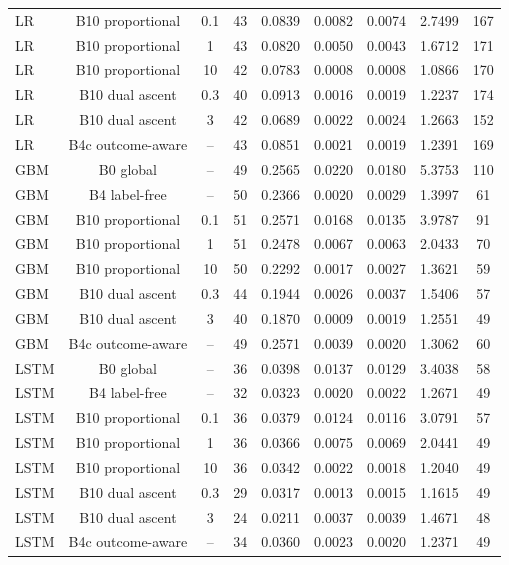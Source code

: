 \documentclass[10pt,onecolumn,letterpaper]{article}
\begin{document}
\begin{table}[!t]
{\begin{tabular}{lcccccccc}
LR & B10 proportional & 0.1 & 43 & 0.0839 & 0.0082 & 0.0074 & 2.7499 & 167 \\
LR & B10 proportional & 1 & 43 & 0.0820 & 0.0050 & 0.0043 & 1.6712 & 171 \\
LR & B10 proportional & 10 & 42 & 0.0783 & 0.0008 & 0.0008 & 1.0866 & 170 \\
LR & B10 dual ascent & 0.3 & 40 & 0.0913 & 0.0016 & 0.0019 & 1.2237 & 174 \\
LR & B10 dual ascent & 3 & 42 & 0.0689 & 0.0022 & 0.0024 & 1.2663 & 152 \\
LR & B4c outcome-aware & -- & 43 & 0.0851 & 0.0021 & 0.0019 & 1.2391 & 169 \\
GBM & B0 global & -- & 49 & 0.2565 & 0.0220 & 0.0180 & 5.3753 & 110 \\
GBM & B4 label-free & -- & 50 & 0.2366 & 0.0020 & 0.0029 & 1.3997 & 61 \\
GBM & B10 proportional & 0.1 & 51 & 0.2571 & 0.0168 & 0.0135 & 3.9787 & 91 \\
GBM & B10 proportional & 1 & 51 & 0.2478 & 0.0067 & 0.0063 & 2.0433 & 70 \\
GBM & B10 proportional & 10 & 50 & 0.2292 & 0.0017 & 0.0027 & 1.3621 & 59 \\
GBM & B10 dual ascent & 0.3 & 44 & 0.1944 & 0.0026 & 0.0037 & 1.5406 & 57 \\
GBM & B10 dual ascent & 3 & 40 & 0.1870 & 0.0009 & 0.0019 & 1.2551 & 49 \\
GBM & B4c outcome-aware & -- & 49 & 0.2571 & 0.0039 & 0.0020 & 1.3062 & 60 \\
LSTM & B0 global & -- & 36 & 0.0398 & 0.0137 & 0.0129 & 3.4038 & 58 \\
LSTM & B4 label-free & -- & 32 & 0.0323 & 0.0020 & 0.0022 & 1.2671 & 49 \\
LSTM & B10 proportional & 0.1 & 36 & 0.0379 & 0.0124 & 0.0116 & 3.0791 & 57 \\
LSTM & B10 proportional & 1 & 36 & 0.0366 & 0.0075 & 0.0069 & 2.0441 & 49 \\
LSTM & B10 proportional & 10 & 36 & 0.0342 & 0.0022 & 0.0018 & 1.2040 & 49 \\
LSTM & B10 dual ascent & 0.3 & 29 & 0.0317 & 0.0013 & 0.0015 & 1.1615 & 49 \\
LSTM & B10 dual ascent & 3 & 24 & 0.0211 & 0.0037 & 0.0039 & 1.4671 & 48 \\
LSTM & B4c outcome-aware & -- & 34 & 0.0360 & 0.0023 & 0.0020 & 1.2371 & 49 \\
\bottomrule
\end{tabular}}
\end{table}
\end{document}
